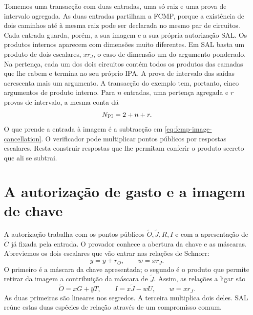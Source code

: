 Tomemos uma transacção com duas entradas, uma só raiz e uma prova
de intervalo agregada. As duas entradas partilham a FCMP, porque
a existência de dois caminhos até à mesma raiz pode ser declarada
no mesmo par de circuitos. Cada entrada guarda, porém, a sua imagem
e a sua própria autorização SAL. Os produtos internos aparecem com
dimensões muito diferentes. Em SAL basta um produto de dois
escalares, \(xr_J\), o caso de dimensão um do argumento ponderado.
Na pertença, cada um dos dois circuitos contém todos os produtos das
camadas que lhe cabem e termina no seu próprio IPA. A prova de
intervalo das saídas acrescenta mais um argumento. A transacção
do exemplo tem, portanto, cinco argumentos de produto interno. Para
\(n\) entradas, uma pertença agregada e \(r\) provas de intervalo,
a mesma conta dá
\begin{equation}
 N_{\rm PI}=2+n+r.
 \label{eq:fcmp-inner-product-count}
\end{equation}
O que prende a entrada à imagem é a subtracção em
\eqref{eq:fcmp-image-cancellation}. O verificador pode multiplicar
pontos públicos por respostas escalares. Resta construir respostas
que lhe permitam conferir o produto secreto que ali se subtrai.

\section{A autorização de gasto e a imagem de chave}
\label{sec:fcmp-sal-product}
\label{sec:fcmp-sal-protocol}
\label{sec:fcmp-sal-transcript}
\label{sec:fcmp-sal-knowledge}

A autorização trabalha com os pontos públicos
\(\widetilde O,\widetilde J,R,I\) e com a apresentação de
\(\widetilde C\) já fixada pela entrada. O provador conhece a
abertura da chave e as máscaras. Abreviemos os dois escalares que
vão entrar nas relações de Schnorr:
\[
 \bar y=y+r_O,\qquad w=xr_J.
\]
O primeiro é a máscara da chave apresentada; o segundo é o produto
que permite retirar da imagem a contribuição da máscara de
\(\widetilde J\). Assim, as relações a ligar são
\[
 \widetilde O=xG+\bar yT,\qquad
 I=x\widetilde J-wU,\qquad w=xr_J.
\]
As duas primeiras são lineares nos segredos. A terceira multiplica
dois deles. SAL reúne estas duas espécies de relação através de
um compromisso comum.

